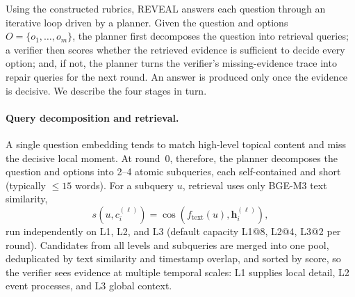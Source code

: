 \documentclass[letterpaper]{article} %
\begin{document}
Using the constructed rubrics, REVEAL answers each question through an iterative loop driven by a planner. Given the question and options $O=\{o_1,\ldots,o_m\}$, the planner first decomposes the question into retrieval queries; a verifier then scores whether the retrieved evidence is sufficient to decide every option; and, if not, the planner turns the verifier's missing-evidence trace into repair queries for the next round. An answer is produced only once the evidence is decisive. We describe the four stages in turn.

\paragraph{Query decomposition and retrieval.}
A single question embedding tends to match high-level topical content and miss the decisive local moment. At round~0, therefore, the planner decomposes the question and options into 2--4 atomic subqueries, each self-contained and short (typically $\le 15$ words). For a subquery $u$, retrieval uses only BGE-M3 text similarity,
\begin{equation}
    s(u,c_i^{(\ell)})=\cos(f_{\mathrm{text}}(u),\mathbf{h}_i^{(\ell)}),
\end{equation}
run independently on L1, L2, and L3 (default capacity L1@8, L2@4, L3@2 per round). Candidates from all levels and subqueries are merged into one pool, deduplicated by text similarity and timestamp overlap, and sorted by score, so the verifier sees evidence at multiple temporal scales: L1 supplies local detail, L2 event processes, and L3 global context.
\end{document}
